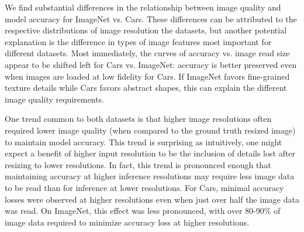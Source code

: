 We find substantial differences in the relationship between image quality and model accuracy for ImageNet vs. Cars.
These differences can be attributed to the respective distributions of image resolution the datasets, but another potential explanation is the difference in types of image features most important for different datasets.
Most immediately, the curves of accuracy vs. image read size appear to be shifted left for Cars vs. ImageNet: accuracy is better preserved even when images are loaded at low fidelity for Cars.
If ImageNet favors fine-grained texture details while Cars favors abstract shapes, this can explain the different image quality requirements.

One trend common to both datasets is that higher image resolutions often required lower image quality (when compared to the ground truth resized image) to maintain model accuracy.
This trend is surprising as intuitively, one might expect a benefit of higher input resolution to be the inclusion of details lost after resizing to lower resolutions.
In fact, this trend is pronounced enough that maintaining accuracy at higher inference resolutions may require less image data to be read than for inference at lower resolutions.
For Cars, minimal accuracy losses were observed at higher resolutions even when just over half the image data was read.
On ImageNet, this effect was less pronounced, with over 80-90\% of image data required to minimize accuracy loss at higher resolutions.


%



